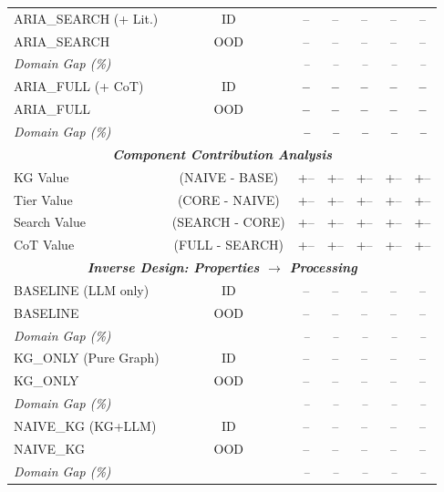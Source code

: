 \begin{table}[ht!]
\begin{tabular}{lcccccc}
ARIA\_SEARCH (+ Lit.) & ID & -- & -- & -- & -- & -- \\
ARIA\_SEARCH & OOD & -- & -- & -- & -- & -- \\
\rowcolor{gray!10}
\textit{Domain Gap (\%)} & & \textit{--} & \textit{--} & \textit{--} & \textit{--} & \textit{--} \\
\midrule

ARIA\_FULL (+ CoT) & ID & \textbf{--} & \textbf{--} & \textbf{--} & \textbf{--} & \textbf{--} \\
ARIA\_FULL & OOD & \textbf{--} & \textbf{--} & \textbf{--} & \textbf{--} & \textbf{--} \\
\rowcolor{gray!10}
\textit{Domain Gap (\%)} & & \textit{\textbf{--}} & \textit{\textbf{--}} & \textit{\textbf{--}} & \textit{\textbf{--}} & \textit{\textbf{--}} \\

\midrule
\midrule
\multicolumn{7}{c}{\textit{\textbf{Component Contribution Analysis}}} \\
\midrule

KG Value & (NAIVE - BASE) & +-- & +-- & +-- & +-- & +-- \\
Tier Value & (CORE - NAIVE) & +-- & +-- & +-- & +-- & +-- \\
Search Value & (SEARCH - CORE) & +-- & +-- & +-- & +-- & +-- \\
CoT Value & (FULL - SEARCH) & +-- & +-- & +-- & +-- & +-- \\

\midrule
\midrule
\multicolumn{7}{c}{\textit{\textbf{Inverse Design: Properties $\rightarrow$ Processing}}} \\
\midrule

BASELINE (LLM only) & ID & -- & -- & -- & -- & -- \\
BASELINE & OOD & -- & -- & -- & -- & -- \\
\rowcolor{gray!10}
\textit{Domain Gap (\%)} & & \textit{--} & \textit{--} & \textit{--} & \textit{--} & \textit{--} \\
\midrule

KG\_ONLY (Pure Graph) & ID & -- & -- & -- & -- & -- \\
KG\_ONLY & OOD & -- & -- & -- & -- & -- \\
\rowcolor{gray!10}
\textit{Domain Gap (\%)} & & \textit{--} & \textit{--} & \textit{--} & \textit{--} & \textit{--} \\
\midrule

NAIVE\_KG (KG+LLM) & ID & -- & -- & -- & -- & -- \\
NAIVE\_KG & OOD & -- & -- & -- & -- & -- \\
\rowcolor{gray!10}
\textit{Domain Gap (\%)} & & \textit{--} & \textit{--} & \textit{--} & \textit{--} & \textit{--} \\
\midrule


\end{tabular}
\end{table}
